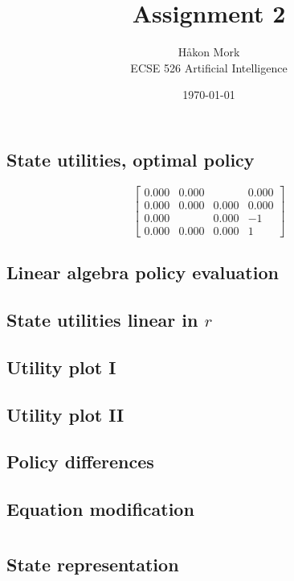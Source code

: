 \documentclass[letterpaper, 10pt, twocolumn]{article}
\title{\textbf{Assignment 2}}
\author{Håkon Mork \\ ECSE 526 Artificial Intelligence}
\date{\today}
\numberwithin{theorem}{section}
\begin{document}
\maketitle
\noindent

\section{}
\subsection{State utilities, optimal policy}
\[
\begin{bmatrix}
0.000 & 0.000 &       & 0.000 \\
0.000 & 0.000 & 0.000 & 0.000 \\
0.000 &       & 0.000 & -1 \\
0.000 & 0.000 & 0.000 & 1
\end{bmatrix}
\]

\subsection{Linear algebra policy evaluation}

\subsection{State utilities linear in $r$}

\subsection{Utility plot I}

\subsection{Utility plot II}

\subsection{Policy differences}

\subsection{Equation modification}


\section{}
\subsection{State representation}
\end{document}
